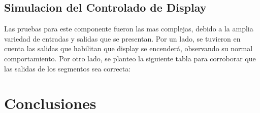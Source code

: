 \documentclass[a4paper,10pt]{article}
\begin{document}
	\subsection{Simulacion del Controlado de Display}
	Las pruebas para este componente fueron las mas complejas, debido a la amplia variedad de entradas y salidas que se presentan. Por un lado, se tuvieron en cuenta las salidas que habilitan que display se encenderá, observando su normal comportamiento. Por otro lado, se planteo la siguiente tabla para corroborar que las salidas de los segmentos sea correcta:
	

\section{Conclusiones}
\end{document}
